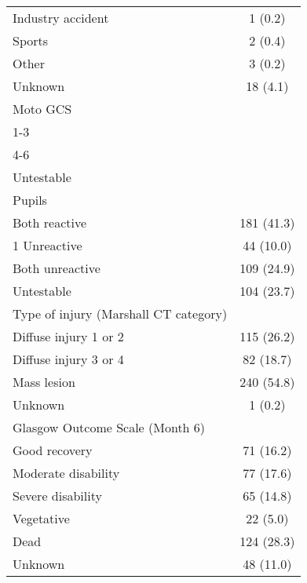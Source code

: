 \documentclass{article}
\begin{document}
\begin{table}[H]
\begin{center}
\begin{tabular}{lc}
\hspace{1 em} Industry accident & 1 (0.2)\\
\hspace{1 em} Sports & 2 (0.4)\\
\hspace{1 em} Other & 3 (0.2)\\
\hspace{1 em} Unknown & 18 (4.1)\\
Moto GCS & \\
\hspace{1 em} 1-3 &\\
\hspace{1 em} 4-6 & \\
\hspace{1 em} Untestable\\
Pupils & \\
\hspace{1 em} Both reactive & 181 (41.3)\\
\hspace{1 em} 1 Unreactive & 44 (10.0)\\
\hspace{1 em} Both unreactive & 109 (24.9)\\
\hspace{1 em} Untestable & 104 (23.7)\\
Type of injury (Marshall CT category) & \\
\hspace{1 em} Diffuse injury 1 or 2 & 115 (26.2)\\
\hspace{1 em} Diffuse injury 3 or 4 & 82 (18.7)\\
\hspace{1 em} Mass lesion & 240 (54.8)\\
\hspace{1 em} Unknown & 1 (0.2) \\
Glasgow Outcome Scale (Month 6)& \\
\hspace{1 em} Good recovery & 71 (16.2)\\
\hspace{1 em} Moderate disability & 77 (17.6)\\
\hspace{1 em} Severe disability & 65 (14.8)\\
\hspace{1 em} Vegetative & 22 (5.0)\\
\hspace{1 em} Dead & 124 (28.3)\\
\hspace{1 em} Unknown & 48 (11.0)\\
\hline
\end{tabular}
\end{center}
\label{demog}
\end{table}%
\end{document}
